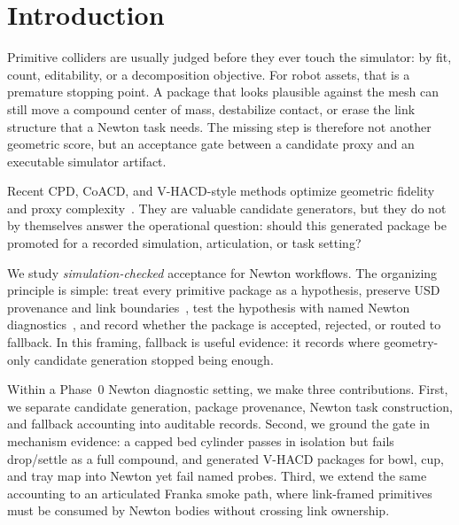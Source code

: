 \section{Introduction}
\label{sec:intro}

Primitive colliders are usually judged before they ever touch the simulator: by fit, count, editability, or a decomposition objective.
For robot assets, that is a premature stopping point.
A package that looks plausible against the mesh can still move a compound center of mass, destabilize contact, or erase the link structure that a Newton task needs.
The missing step is therefore not another geometric score, but an acceptance gate between a candidate proxy and an executable simulator artifact.

Recent CPD, CoACD, and V-HACD-style methods optimize geometric fidelity and proxy complexity~\cite{cpd2026,coacd2022,vhacd}.
They are valuable candidate generators, but they do not by themselves answer the operational question: should this generated package be promoted for a recorded simulation, articulation, or task setting?

We study \emph{simulation-checked} acceptance for Newton workflows.
The organizing principle is simple: treat every primitive package as a hypothesis, preserve USD provenance and link boundaries~\cite{openusd2026}, test the hypothesis with named Newton diagnostics~\cite{newton2026}, and record whether the package is accepted, rejected, or routed to fallback.
In this framing, fallback is useful evidence: it records where geometry-only candidate generation stopped being enough.

Within a Phase~0 Newton diagnostic setting, we make three contributions.
First, we separate candidate generation, package provenance, Newton task construction, and fallback accounting into auditable records.
Second, we ground the gate in mechanism evidence: a capped bed cylinder passes in isolation but fails drop/settle as a full compound, and generated V-HACD packages for bowl, cup, and tray map into Newton yet fail named probes.
Third, we extend the same accounting to an articulated Franka smoke path, where link-framed primitives must be consumed by Newton bodies without crossing link ownership.


